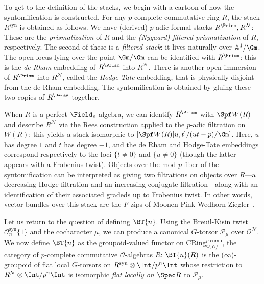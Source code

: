 \documentclass[10pt]{amsart}
\begin{document}
To get to the definition of the stacks, we begin with a cartoon of how the syntomification is constructed. For any $p$-complete commutative ring $R$, the stack $R^{\mathrm{syn}}$ is obtained as follows. We have (derived) $p$-adic formal stacks $R^{\Prism},R^{\mathcal{N}}$: These are the \emph{prismatization} of $R$ and the \emph{(Nygaard) filtered prismatization} of $R$, respectively. The second of these is a \emph{filtered stack}: it lives naturally over $\mathbb{A}^1/\Gm$. The open locus lying over the point $\Gm/\Gm$ can be identified with $R^\Prism$: this is the \emph{de Rham} embedding of $R^\Prism$ into $R^{\mathcal{N}}$. There is another open immersion of $R^\Prism$ into $R^{\mathcal{N}}$, called the \emph{Hodge-Tate} embedding, that is physically disjoint from the de Rham embedding. The syntomification is obtained by gluing these two copies of $R^\Prism$ together.

\begin{introrem}
\label{introrem:perfect_case}
When $R$ is a perfect $\Field_p$-algebra, we can identify $R^\Prism$ with $\Spf W(R)$ and describe $R^{\mathcal{N}}$ via the Rees construction applied to the $p$-adic filtration on $W(R)$: this yields a stack isomorphic to $[\Spf W(R)[u,t]/(ut-p)/\Gm]$. Here, $u$ has degree $1$ and $t$ has degree $-1$, and the de Rham and Hodge-Tate embeddings correspond respectively to the loci $\{t\neq  0\}$ and $\{u\neq 0\}$ (though the latter appears with a Frobenius twist). Objects over the mod-$p$ fiber of the syntomification can be interpreted as giving two filtrations on objects over $R$---a decreasing Hodge filtration and an increasing conjugate filtration---along with an identification of their associated gradeds up to Frobenius twist. In other words, vector bundles over this stack are the $F$-zips of Moonen-Pink-Wedhorn-Ziegler~\cite{Pink2015-ye}.
\end{introrem}

Let us return to the question of defining $\BT{n}$. Using the Breuil-Kisin twist $\mathcal{O}^{\mathrm{syn}}_n\{1\}$ and the cocharacter $\mu$, we can produce a canonical $G$-torsor $\mathcal{P}_\mu$ over $\mathcal{O}^{\mathcal{N}}$. We now define $\BT{n}$ as the groupoid-valued functor on $\mathrm{CRing}^{p\text{-comp}}_{\heartsuit,\mathcal{O}/}$, the category of $p$-complete commutative $\mathcal{O}$-algebras $R$: $\BT{n}(R)$ is the ($\infty$)-groupoid of flat local $G$-torsors on $R^{\mathrm{syn}}\otimes\Int/p^n\Int$ whose restriction to $R^{\mathcal{N}}\otimes\Int/p^n\Int$ is isomorphic \emph{flat locally on $\Spec R$} to $\mathcal{P}_\mu$.
\end{document}
